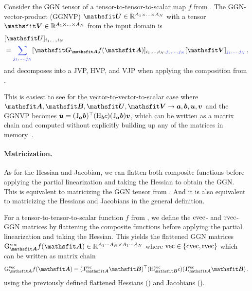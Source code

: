 \begin{definition}\label{def:ggnvp}%
  Consider the GGN tensor of a tensor-to-tensor-to-scalar map $f$ from .
  The GGN-vector-product (GGNVP) $\tU \in \sR^{A_1 \times \ldots \times A_N}$ with a tensor $\tV \in \sR^{A_1 \times \ldots \times A_N}$ from the input domain is
  \begin{align*}
    & [\tU]_{i_1, \dots, i_N}
    \\
    & =
      \colored{\sum_{j_1, \dots, j_N}}
      [\tG_{\tA} f(\tA)]_{i_1, \dots, i_N, \colored{j_1, \dots, j_N}}
      [\tV]_{\colored{j_1, \dots, j_N}}\,,
  \end{align*}
  and decomposes into a JVP, HVP, and VJP when applying the composition from .
\end{definition}
This is easiest to see for the vector-to-vector-to-scalar case where $\tA, \tB, \tU, \tV \to \va, \vb, \vu, \vv$ and the GGNVP becomes ${\bm{u}} = (\mathrm{J}_{{\bm{a}}}{\bm{b}})^{\top} (\mathrm{H}_{{\bm{b}}} c) (\mathrm{J}_{{\bm{a}}} {\bm{b}}) {\bm{v}}$, which can be written as a matrix chain and computed without explicitly building up any of the matrices in memory~\cite{schraudolph2002fast}.

\paragraph{Matricization.} As for the Hessian and Jacobian, we can flatten both composite functions before applying the partial linearization and taking the Hessian to obtain the GGN.
This is equivalent to matricizing the GGN tensor from .
And it is also equivalent to matricizing the Hessians and Jacobians in the general definition.

\begin{definition}\label{def:vec_ggns}
  For a tensor-to-tensor-to-scalar function $f$ from , we define the $\operatorname{cvec}$- and $\operatorname{rvec}$-GGN matrices by flattening the composite functions before applying the partial linearization and taking the Hessian. This yields the flattened GGN matrices $\ggn^{\vec}_{\tA}f(\tA) \in \sR^{A_1 \cdots A_N \times A_1 \cdots A_N}$ where $\operatorname{vec} \in \{\operatorname{cvec}, \operatorname{rvec}\}$ which can be written as matrix chain
  \begin{align*}
    \ggn^{\vec}_{\tA} f(\tA)
    =
    (\jac^{\vec}_{\tA} \tB)^{\top}
    (\hess^{\vec}_{\tB} c)
    (\jac^{\vec}_{\tA} \tB)\,.
  \end{align*}
  using the previously defined flattened Hessians () and Jacobians ().
\end{definition}

